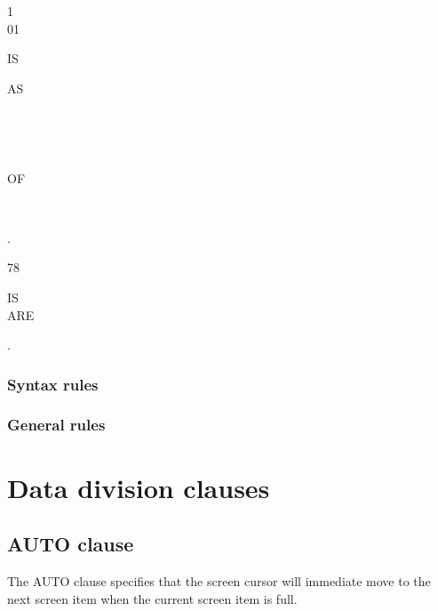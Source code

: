 \begin{syntax}
  \begin{1=}
    1 \\
    01
  \end{1=}
  \identifier {}
  \begin{0-1}
    IS 
  \end{0-1}
  \begin{1=}
    AS
    \begin{1=}
      \literal \\
      \begin{1=}
         \\
      \end{1=}
      OF \identifier
    \end{1=} \\
  \end{1=}.
\end{syntax}

\begin{syntax}[\miscextcolour]
  78 \identifier
  \begin{0-1}
    IS \\
    ARE
  \end{0-1}
  \literal .
\end{syntax}

\subsubsection{Syntax rules}

\subsubsection{General rules}

\section{Data division clauses}

\subsection{AUTO clause}

The AUTO clause specifies that the screen cursor will immediate move to the next screen item when the current screen item is full.

